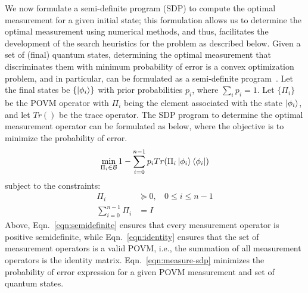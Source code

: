 We now formulate a 
semi-definite program (SDP) to compute the optimal measurement 
for a given initial state; this formulation allows us to determine the optimal measurement 
using numerical methods, and thus, facilitates the development of the
search heuristics for the \iso problem as described below.
Given a set of (final) quantum states, determining the optimal measurement that
discriminates them with minimum probability of error is a convex optimization problem, and in particular, can be formulated as a semi-definite program~\cite{Eldar_2003}.
Let the final states be $\{\ket{\phi_i}\}$ with
prior 
probabilities $p_{i}$, where $\sum_i p_i = 1$.
Let $\{\Pi_{i}\}$ be the POVM operator with $\Pi_{i}$ being the element associated with the state $\ket{\phi_i}$, and let $Tr()$ be the trace operator.
The SDP program to determine the optimal measurement operator can be formulated
as below, where the objective is to minimize the probability of error.
\begin{equation}
    \min_{\Pi_{i} \in \mathcal{B}} 1 - \sum_{i=0}^{n-1} p_{i} Tr(\Pi_{i} \ket{\phi_i}\bra{\phi_i} )
    \label{eqn:measure-sdp}
\end{equation}
subject to the constraints:
\begin{align}
    \Pi_{i} & \succeq 0, \ \ \ \   0 \leq i \leq n-1 \label{eqn:semidefinite} \\
    \sum_{i=0}^{n-1} \Pi_{i} &= I \label{eqn:identity}
\end{align}
Above, Eqn.~\ref{eqn:semidefinite} ensures that every measurement operator is positive semidefinite, while Eqn.~\ref{eqn:identity} ensures that the set of measurement operators is a valid POVM, i.e., the summation of all measurement operators is the identity matrix.
Eqn.~\ref{eqn:measure-sdp} minimizes the probability of error expression for a given POVM measurement and set of quantum states.


